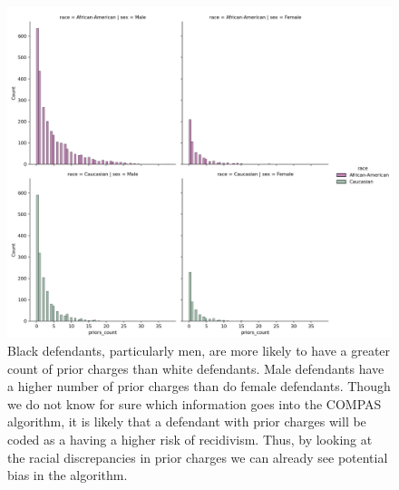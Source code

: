 \documentclass[water,article,submit,moreauthors,pdftex]{mdpi}
\begin{document}
\begin{figure}

{\centering \includegraphics[width=1\linewidth]{../images/prior_charges_plot} 

}

\caption{Black defendants, particularly men, are more likely to have a greater count of prior charges than white defendants. Male defendants have a higher number of prior charges than do female defendants. Though we do not know for sure which information goes into the COMPAS algorithm, it is likely that a defendant with prior charges will be coded as a having a higher risk of recidivism. Thus, by looking at the racial discrepancies in prior charges we can already see potential bias in the algorithm.}\label{fig:prior plot}
\end{figure}
\end{document}
